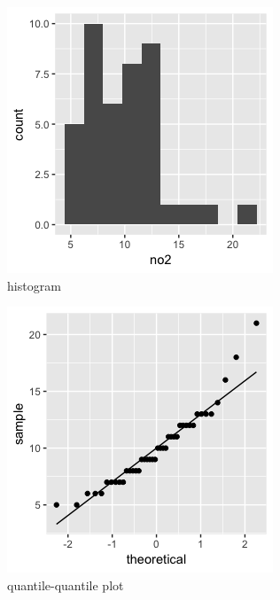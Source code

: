\begin{figure}[H]
\begin{subfigure}{.33\textwidth}
  \centering
  \includegraphics[width=.8\linewidth]{plot_4_29_X1hist.png}
  \caption{histogram}
  \label{fig:sfig1}
\end{subfigure}%
\begin{subfigure}{.33\textwidth}
  \centering
  \includegraphics[width=.8\linewidth]{plot_4_29_X1qq.png}
  \caption{quantile-quantile plot}
  \label{fig:sfig2}
\end{subfigure}
\begin{subfigure}{.33\textwidth}

\end{subfigure}
\end{figure}
